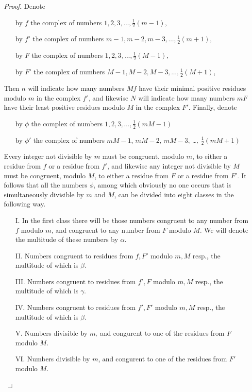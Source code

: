 \documentclass{book}
\theoremstyle{plain}
\theoremstyle{remark}
\begin{document}
\begin{proof} Denote
\begin{enumerate}
\item[ ] by $f$ the complex of numbers $1,2,3,\dots,\tfrac{1}{2}(m-1)$,
\item[ ] by $f'$ the complex of numbers $m-1,m-2,m-3,\dots,\tfrac{1}{2}(m+1)$,
\item[ ] by $F$ the complex of numbers $1,2,3,\dots,\tfrac{1}{2}(M-1)$,
\item[ ] by $F'$ the complex of numbers $M-1,M-2,M-3,\dots,\tfrac{1}{2}(M+1)$,
\end{enumerate}
Then $n$ will indicate how many numbers $Mf$ have their minimal positive residues modulo $m$ in the complex $f'$, and likewise $N$ will indicate how many numbers $mF$ have their least positive residues modulo $M$ in the complex $F'$.  Finally, denote
\begin{enumerate}
\item[ ] by $\phi$ the complex of numbers $1,2,3,\dots,\tfrac{1}{2}(mM-1)$ 
\item[ ] by $\phi'$ the complex of numbers $mM-1$, $mM-2$, $mM-3$, \dots, $\tfrac{1}{2}(mM+1)$
\end{enumerate}
Every integer not divisible by $m$ must be congruent, modulo $m$, to either a residue from $f$ or a residue from $f'$,  and likewise any integer not divisible by $M$ must be congruent, modulo $M$, to either a residue from $F$ or a residue from $F'$.  It follows that all the numbers $\phi$, among which obviously no one occurs that is simultaneously divisible by $m$ and $M$, can be divided into eight classes in the following way.
\begin{enumerate}
\item[I.] In the first class there will be those numbers congruent to any number from $f$ modulo $m$, and congruent to any number from $F$ modulo $M$.  We will denote the multitude of these numbers by $\alpha$.
\item[II.] Numbers congruent to residues from $f, F'$ modulo $m, M$ resp., the multitude of which is $\beta$.
\item[III.] Numbers congruent to residues from $f', F$ modulo $m, M$ resp., the multitude of which is $\gamma$.
\item[IV.] Numbers congruent to residues from $f', F'$ modulo $m, M$ resp., the multitude of which is $\beta$.
\item[V.] Numbers divisible by $m$, and congurent to one of the residues from $F$ modulo $M$.
\item[VI.] Numbers divisible by $m$, and congurent to one of the residues from $F'$ modulo $M$.

\end{enumerate}
\end{proof}
\end{document}
